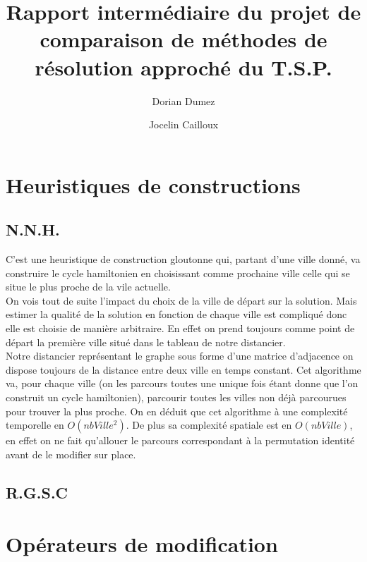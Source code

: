 \documentclass[12pt,a4paper]{article}
\title{Rapport intermédiaire du projet de comparaison de méthodes de résolution approché du T.S.P.}
\author{Dorian Dumez \and Jocelin Cailloux}
\begin{document}
\maketitle
\section{Heuristiques de constructions}
\subsection{N.N.H.}
C'est une heuristique de construction gloutonne qui, partant d'une ville donné, va construire le cycle hamiltonien en choisissant comme prochaine ville celle qui se situe le plus proche de la vile actuelle.\\
On vois tout de suite l'impact du choix de la ville de départ sur la solution. Mais estimer la qualité de la solution en fonction de chaque ville est compliqué donc elle est choisie de manière arbitraire. En effet on prend toujours comme point de départ la première ville situé dans le tableau de notre distancier.\\
Notre distancier représentant le graphe sous forme d'une matrice d'adjacence on dispose toujours de la distance entre deux ville en temps constant. Cet algorithme va, pour chaque ville (on les parcours toutes une unique fois étant donne que l'on construit un cycle hamiltonien), parcourir toutes les villes non déjà parcourues pour trouver la plus proche. On en déduit que cet algorithme à une complexité temporelle en $O(nbVille^2)$. De plus sa complexité spatiale est en $O(nbVille)$, en effet on ne fait qu’allouer le parcours correspondant à la permutation identité avant de le modifier sur place.\\

\subsection{R.G.S.C}

\section{Opérateurs de modification}
\end{document}
